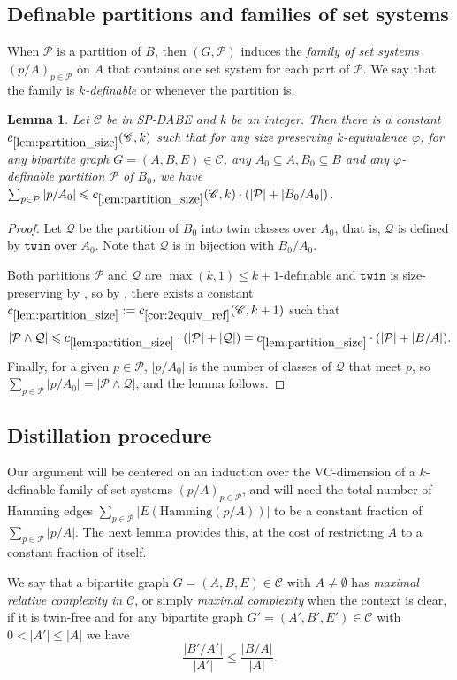 \documentclass[11pt]{article}
\newtheorem{lemma}[theorem]{Lemma}
\theoremstyle{definition}
\newcommand{\CC}{{\mathscr C}}
\renewcommand{\leq}{\leqslant}
\renewcommand{\le}{\leqslant}
\let\phi\varphi
\newcommand{\Pp}{\mathcal{P}}
\newcommand{\Qq}{\mathcal{Q}}
\newcommand{\remph}[1]{{\color{red} \emph{#1}}}
\newcommand{\hamming}{\mathrm{Hamming}}
\newcommand{\twin}{\mathtt{twin}}
\begin{document}
\subsection{Definable partitions and families of set systems}
When $\Pp$ is a partition of $B$, then $(G, \Pp)$ induces the \remph{family of set systems} $(p/A)_{p \in \Pp}$ on $A$ that contains one set system for each part of $\Pp$. We say that the family is \remph{$k$-definable} or whenever the partition is.

\begin{lemma}\label{lem:partition_size}
Let $\CC$ be in SP-DABE and $k$ be an integer. Then there is a constant $c_{\ref{lem:partition_size}}(\CC, k) $ such that
for any size preserving $k$-equivalence $\phi$, for any bipartite graph $G = (A, B, E) \in \CC$, any $A_0 \subseteq A, B_0 \subseteq B$ and any $\phi$-definable partition $\Pp$ of $B_0$, we have $\sum_{p \in \Pp} |p/A_0| \leq c_{\ref{lem:partition_size}}(\CC, k) \cdot (|\Pp| + |B_0/A_0|)$.
\end{lemma}
\begin{proof}
Let $\Qq$ be the partition of $B_0$ into twin classes over $A_0$, that is, $\Qq$ is defined by $\twin$ over $A_0$. Note that $\Qq$ is in bijection with $B_0/A_0$.

Both partitions $\Pp$ and $\Qq$ are $\max(k, 1) \le k+1$-definable and $\twin$ is size-preserving by , so by , there exists a constant $c_{\ref{lem:partition_size}} := c_{\ref{cor:2equiv_ref}} (\CC, k+1)$ such that 
\[
|\Pp \wedge \Qq| \leqslant c_{\ref{lem:partition_size}} \cdot (|\Pp| + |\Qq|) = c_{\ref{lem:partition_size}} \cdot (|\Pp| + |B/A|).
\]
Finally, for a given $p \in \Pp$, $|p/A_0|$ is the number of classes of $\Qq$ that meet $p$, so $\sum_{p \in \Pp} |p/A_0| = |\Pp \wedge \Qq|$, and the lemma follows.
\end{proof}


\subsection{Distillation procedure}
Our argument will be centered on an induction over the VC-dimension of a $k$-definable family of set systems $(p/A)_{p \in \Pp}$, and will need the total number of Hamming edges $\sum_{p \in \Pp} |E(\hamming(p/A))|$ to be a constant fraction of $\sum_{p \in \Pp} |p/A|$. The next lemma provides this, at the cost of restricting $A$ to a constant fraction of itself.

We say that a bipartite graph $G = (A, B, E) \in \CC$ with $A \neq \emptyset$ has \remph{maximal relative complexity in $\CC$}, or simply \remph{maximal complexity} when the context is clear, if it is twin-free and for any bipartite graph $G' = (A', B', E') \in \CC$ with $0 < |A'| \leq |A|$ we have
\[
\frac{|B'/A'|}{|A'|} \leq \frac{|B/A|}{|A|}.
\]
\end{document}
